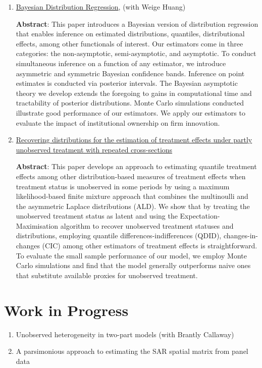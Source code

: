 \documentclass[12pt,letterpaper]{article}
\begin{document}
\begin{enumerate}
	
	\item \href{https://papers.ssrn.com/sol3/papers.cfm?abstract_id=3048658}{Bayesian Distribution Regression}, (with Weige Huang)
	
	\textbf{Abstract}: This paper introduces a Bayesian version of distribution regression that enables inference on estimated distributions, quantiles, distributional effects, among other functionals of interest. Our estimators come in three categories: the non-asymptotic, semi-asymptotic, and asymptotic. To conduct simultaneous inference on a function of any estimator, we introduce asymmetric and symmetric Bayesian confidence bands. Inference on point estimates is conducted via posterior intervals. The Bayesian asymptotic theory we develop extends the foregoing to gains in computational time and tractability of posterior distributions. Monte Carlo simulations conducted illustrate good performance of our estimators. We apply our estimators to evaluate the impact of institutional ownership on firm innovation. 
	
	\item \href{https://papers.ssrn.com/sol3/papers.cfm?abstract_id=3194286}{Recovering distributions for the estimation of treatment
		effects under partly unobserved treatment with repeated
		cross-sections}
	
	\textbf{Abstract}: This paper develops an approach to estimating quantile treatment effects among other distribution-based measures of treatment effects when treatment status is unobserved in some periods by using a maximum likelihood-based finite mixture approach that combines the multinoulli and the asymmetric Laplace distributions (ALD). We show that by treating the unobserved treatment status as latent and using the Expectation-Maximisation algorithm to recover unobserved treatment statuses and distributions, employing quantile differences-indifferences (QDID), changes-in-changes (CIC) among other estimators of treatment effects is straightforward. To evaluate the small sample performance of our model, we employ Monte Carlo simulations and find that the model generally outperforms naive ones that substitute available proxies for unobserved treatment.
\end{enumerate}

\section*{Work in Progress}
\begin{enumerate}
	\item Unobserved heterogeneity in two-part models (with Brantly Callaway)
	\item A parsimonious approach to estimating the SAR spatial matrix from panel data
\end{enumerate}
\end{document}
